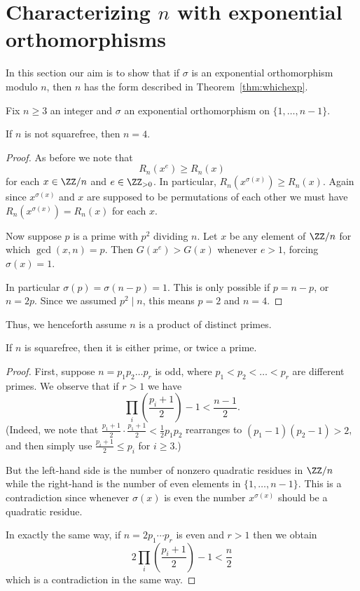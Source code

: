 \section{Characterizing $n$ with exponential orthomorphisms}
\label{sec:expreduce}
In this section our aim is to show that
if $\sigma$ is an exponential orthomorphism modulo $n$,
then $n$ has the form described in Theorem~\ref{thm:whichexp}.

Fix $n \ge 3$ an integer
and $\sigma$ an exponential orthomorphism on $\{1, \dots, n-1\}$.

\begin{proposition}
	If $n$ is not squarefree, then $n = 4$.
\end{proposition}
\begin{proof}
	As before we note that
	\[ R_n(x^e) \ge R_n(x) \]
	for each $x \in \ZZ/n$ and $e \in \ZZ_{>0}$.
	In particular, $R_n(x^{\sigma(x)}) \ge R_n(x)$.
	Again since $x^{\sigma(x)}$ and $x$ are supposed to
	be permutations of each other
	we must have $R_n(x^{\sigma(x)}) = R_n(x)$ for each $x$.

	Now suppose $p$ is a prime with $p^2$ dividing $n$.
	Let $x$ be any element of $\ZZ/n$
	for which $\gcd(x, n) = p$.
	Then $G(x^e) > G(x)$ whenever $e > 1$, forcing $\sigma(x) = 1$.

	In particular $\sigma(p) = \sigma(n-p) = 1$.
	This is only possible if $p = n-p$, or $n = 2p$.
	Since we assumed $p^2 \mid n$, this means $p=2$ and $n=4$.
\end{proof}

Thus, we henceforth assume $n$ is a product of distinct primes.
\begin{proposition}
	If $n$ is squarefree,
	then it is either prime, or twice a prime.
 \end{proposition}
\begin{proof}
	First, suppose $n = p_1 p_2 \dots p_r$ is odd,
	where $p_1 < p_2 < \dots < p_r$ are different primes.
	We observe that if $r > 1$ we have
	\[ \prod_i \left( \frac{p_i+1}{2} \right) - 1 < \frac{n-1}{2}. \]
	(Indeed, we note that $\frac{p_1+1}{2} \cdot \frac{p_1+1}{2} < \frac12 p_1p_2$
	rearranges to $(p_1-1)(p_2-1) > 2$,
	and then simply use $\frac{p_i+1}{2} \le p_i$ for $i \ge 3$.)

	But the left-hand side is the number of nonzero quadratic residues
	in $\ZZ/n$ while the right-hand is the number of even elements
	in $\{1, \dots, n-1\}$.
	This is a contradiction since whenever $\sigma(x)$ is even
	the number $x^{\sigma(x)}$ should be a quadratic residue.

	In exactly the same way, if $n = 2 p_1 \cdots p_r$ is even
	and $r > 1$ then we obtain
	\[ 2\prod_i \left( \frac{p_i+1}{2} \right) - 1 < \frac n2 \]
	which is a contradiction in the same way.
\end{proof}

